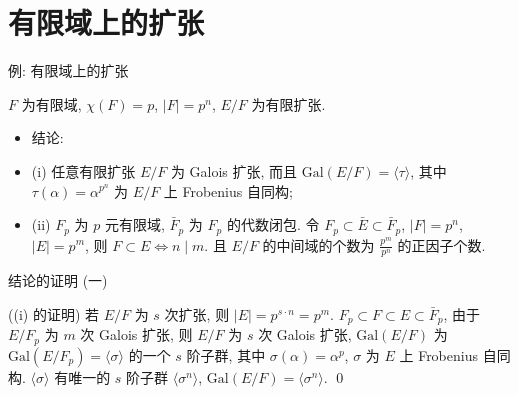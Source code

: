 
\section[有限域]{有限域上的扩张}


\begin{frame}{例: 有限域上的扩张}

\begin{eg}[有限域上的扩张]
$F$ 为有限域, $\chi(F) = p$, $|F| = p^n$, $E/F$ 为有限扩张.
\end{eg}

\begin{itemize}
\item 结论:
\item (i) 任意有限扩张 $E/F$ 为 Galois 扩张,
  而且 $\mathrm{Gal}(E/F) = \langle \tau \rangle$,
  其中 $\tau(\alpha) = \alpha^{p^n}$ 为 $E/F$ 上 Frobenius 自同构;
\item (ii) $F_p$ 为 $p$ 元有限域, $\bar{F}_p$ 为 $F_p$ 的代数闭包.
  令 $F_p \subset \bar{E} \subset \bar{F}_p$, $|F| = p^n$, $|E| = p^m$, 则
  $F \subset E \iff n \mid m$. 且 $E/F$ 的中间域的个数为
  $\frac{p^m}{p^n}$ 的正因子个数.
\end{itemize}

\end{frame}


\begin{frame}{结论的证明 (一)}

\startproof[bg=yellow, fg=red]((i) 的证明)
若 $E/F$ 为 $s$ 次扩张, 则 $|E| = p^{s \cdot n} = p^m$.
$F_p \subset F \subset E \subset \bar{F}_p$, 由于 $E/F_p$ 为 $m$ 次 Galois 扩张,
则 $E/F$ 为 $s$ 次 Galois 扩张,
$\mathrm{Gal}(E/F)$ 为 $\mathrm{Gal}(E/F_p) = \langle \sigma \rangle$ 的一个
$s$ 阶子群, 其中 $\sigma(\alpha) = \alpha^p$, $\sigma$ 为 $E$ 上 Frobenius 自同构.
$\langle \sigma \rangle$ 有唯一的 $s$ 阶子群 $\langle \sigma^{n} \rangle$,
$\mathrm{Gal}(E/F) = \langle \sigma^{n} \rangle$.
\qed

\end{frame}


